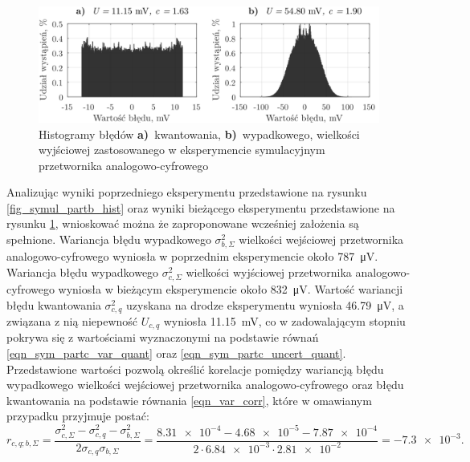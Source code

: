 \begin{figure}[htb!]
\begin{center}
\includegraphics{obrazki/hist_part_c}
\caption{Histogramy błędów \textbf{a)}~kwantowania, \textbf{b)}~wypadkowego, wielkości wyjściowej zastosowanego w eksperymencie symulacyjnym przetwornika analogowo-cyfrowego \label{fig_symul_partc_hist}}
\end{center}
\end{figure}

Analizując wyniki poprzedniego eksperymentu przedstawione na rysunku \ref{fig_symul_partb_hist} oraz wyniki bieżącego eksperymentu przedstawione na rysunku \ref{fig_symul_partc_hist}, wnioskować można że zaproponowane wcześniej założenia są spełnione. Wariancja błędu wypadkowego $\sigma_{b,\Sigma}^{2}$ wielkości wejściowej przetwornika analogowo-cyfrowego wyniosła w poprzednim eksperymencie około \qty{787}{\micro V}. Wariancja błędu wypadkowego $\sigma_{c,\Sigma}^{2}$ wielkości wyjściowej przetwornika analogowo-cyfrowego wyniosła w bieżącym eksperymencie około \qty{832}{\micro V}. Wartość wariancji błędu kwantowania $\sigma_{c,q}^{2}$ uzyskana na drodze eksperymentu wyniosła \qty{46.79}{\micro V}, a związana z nią niepewność $U_{c,q}$ wyniosła \qty{11.15}{mV}, co w zadowalającym stopniu pokrywa się z wartościami wyznaczonymi na podstawie równań \eqref{eqn_sym_partc_var_quant} oraz \eqref{eqn_sym_partc_uncert_quant}. Przedstawione wartości pozwolą określić korelacje pomiędzy wariancją błędu wypadkowego wielkości wejściowej przetwornika analogowo-cyfrowego oraz błędu kwantowania na podstawie równania \eqref{eqn_var_corr}, które w omawianym przypadku przyjmuje postać:
\begin{equation}
r_{c,q;b,\Sigma} = \frac{\sigma_{c,\Sigma}^{2} - \sigma_{c,q}^{2} - \sigma_{b,\Sigma}^{2}}{2 \sigma_{c,q} \sigma_{b,\Sigma}} = \frac{\num{8.31e-4} - \num{4.68e-5} - \num{7.87e-4}}{2 \cdot \num{6.84e-3} \cdot \num{2.81e-2}} = \num{-7.3e-3} \label{eqn_sym_partc_corr}.
\end{equation}

